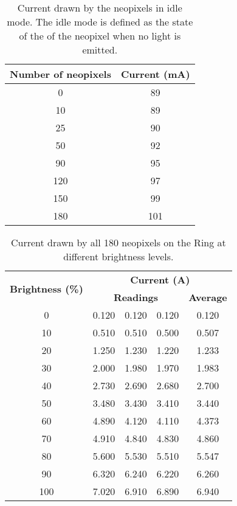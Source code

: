\begin{table}[h!]
	\centering
	\caption{Current drawn by the neopixels in idle mode. The idle mode is defined as the state of the of the neopixel when no light is emitted.}
	\label{table:current_idle}
	\begin{tabular}{cc}
		\hline
		\hline
		\toprule
		\textbf{Number of neopixels} & \textbf{Current (mA)}\\
		\bottomrule
		\toprule
		0    &    89    \\
		10    &    89    \\
		25    &    90    \\
		50    &    92    \\
		90    &    95    \\
		120    &    97    \\
		150    &    99    \\
		180    &    101    \\
		\bottomrule
		\hline
		\hline
	\end{tabular}
\end{table}		
\begin{table}[h!]
	\centering
	\caption{Current drawn by all 180 neopixels on the Ring at different brightness levels.}
	\label{table:current_180_neopixels}
	\begin{tabular}{ccccc}
		\hline
		\hline
		\toprule
		\multirow{2}{*}{\textbf{Brightness (\%)}} & \multicolumn{4}{c}{\textbf{Current (A)}}\\
		& \multicolumn{3}{c}{\textbf{Readings}} & \textbf{Average} \\
		\bottomrule
		\toprule
		0    &    0.120    &    0.120    &    0.120    &    0.120    \\
		10    &    0.510    &    0.510    &    0.500    &    0.507    \\
		20    &    1.250    &    1.230    &    1.220    &    1.233    \\
		30    &    2.000    &    1.980    &    1.970    &    1.983    \\
		40    &    2.730    &    2.690    &    2.680    &    2.700    \\
		50    &    3.480    &    3.430    &    3.410    &    3.440    \\
		60    &    4.890    &    4.120    &    4.110    &    4.373    \\
		70    &    4.910    &    4.840    &    4.830    &    4.860    \\
		80    &    5.600    &    5.530    &    5.510    &    5.547    \\
		90    &    6.320    &    6.240    &    6.220    &    6.260    \\
		100    &    7.020    &    6.910    &    6.890    &    6.940    \\
		\bottomrule
		\hline
		\hline
	\end{tabular}
\end{table}				

